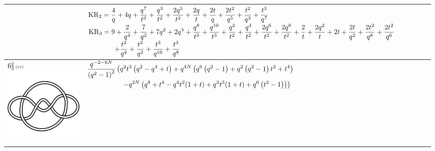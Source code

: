 \documentclass{compositio}
\theoremstyle{definition}
\numberwithin{equation}{section}
\begin{document}
{\begin{longtable}{p{}|p{}}
& 
\newline 
$
\displaystyle{%
\KR_{2} = \frac{4}{q}+4 q+\frac{q^7}{t^3}+\frac{q^3}{t^2}+\frac{2 q^5}{t^2}+\frac{2 q}{t}+\frac{2 t}{q}+\frac{2 t^2}{q^5}+\frac{t^2}{q^3}+\frac{t^3}{q^7}
}
$
\newline 
$
\displaystyle{%
\KR_{3} = 9+\frac{2}{q^4}+\frac{7}{q^2}+7 q^2+2 q^4+\frac{q^8}{t^3}+\frac{q^{10}}{t^3}+\frac{q^2}{t^2}+\frac{q^4}{t^2}+\frac{2 q^6}{t^2}+\frac{2 q^8}{t^2}+\frac{2}{t}+\frac{2 q^2}{t}+2 t+\frac{2 t}{q^2}+\frac{2 t^2}{q^8}+\frac{2 t^2}{q^6}
}
$
\newline
$
\displaystyle{%
\qquad\qquad +\frac{t^2}{q^4}+\frac{t^2}{q^2}+\frac{t^3}{q^{10}}+\frac{t^3}{q^8}
}
$
\newline 
\\
\hline
$6_{3}^2\,\text{{\tiny (v1)}}$ 
\includegraphics[scale=0.07,angle=0]{link6_3_2.pdf} 
& 
\newline
$
\displaystyle{%
\frac{q^{-2-6 N}}{\left(q^2-1\right)^2} \left(q^2 t^3 \left(q^2-q^4+t\right)+q^{4 N} \left(q^6 \left(q^2-1\right)+q^2 \left(q^2-1\right) t^2+t^4\right) \right.
}
$
\newline
$
\displaystyle{%
\left. \qquad\qquad\quad -q^{2 N} \left(q^8+t^4-q^4 t^2 (1+t)+q^2 t^3 (1+t)+q^6 \left(t^2-1\right)\right)\right)
}
$
\newline

\end{longtable}}
\end{document}

